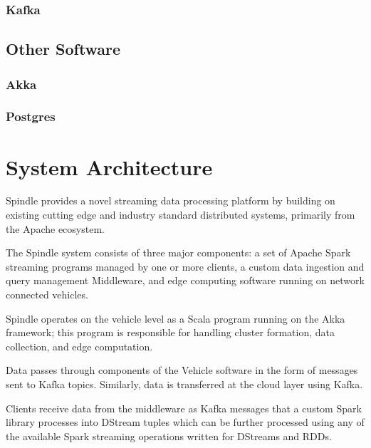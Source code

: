 \documentclass{thesis}
\begin{document}
    \subsection{Kafka}
    \section{Other Software}
    \subsection{Akka}
    \subsection{Postgres}

%


\chapter{System Architecture}
    Spindle provides a novel streaming data processing platform by building on
    existing cutting edge and industry standard distributed systems, primarily
    from the Apache ecosystem. 

    The Spindle system consists of three major components: a set of Apache Spark %
    streaming programs managed by one or more clients, a custom data ingestion and
    query management Middleware, and edge computing software running on network
    connected vehicles.
    
    Spindle operates on the vehicle level as a Scala
    \cite{scala} program running on the Akka \cite{akka} framework; this program
    is responsible for handling cluster formation, data collection, and edge
    computation.

    Data passes through components of the Vehicle software in the form of 
    messages sent to Kafka \cite{kafka} topics. Similarly, data is transferred
    at the cloud layer using Kafka.

    Clients receive data from the middleware as Kafka messages that a custom Spark \cite{spark}
    library processes into DStream tuples which can be further processed using any of the available
    Spark streaming operations written for DStreams and RDDs.
\end{document}
